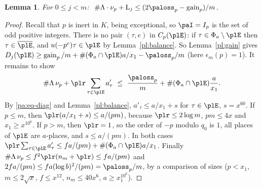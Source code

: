 \documentclass[10pt]{amsart}
\newtheorem{lemma}[theorem]{Lemma}
\theoremstyle{definition}
\theoremstyle{remark}
\providecommand{\auPa}{\Phi_a}
\providecommand{\aubar}[1]{\overline{#1}}
\providecommand{\augain}{\operatorname{gain}}
\begin{document}
\begin{lemma}\label{pl:arith}
For $0\le j<m$: $\ \#\Lambda\cdot\nu_p+\mathrm L_j\le(2\paloss_p-\augain_p)/m$.
\end{lemma}
\begin{proof}
Recall that $p$ is inert in $K$, being exceptional, so $\paI=I_p$ is the set of odd positive
integers. There is no pair $(\tau,e)$ in $C_p(\plE)$: if $\tau\in\auPa\setminus\plE$ then $\tau\in\aubar
\plE$, and $u(-p^e)\tau\in\plE$ by Lemma~\ref{pl:balance}. So Lemma~\ref{pl:gain} gives
$D_j(\plE)\ge\augain_p/m+\#(\auPa\cap\plE)a/x_1-\paloss_p/m$ (here $\epsilon_m(p)=1$). It remains
to show
\[
\#\Lambda\,\nu_p+\plr\sum_{\tau\in\plE}a'_\tau\ \le\ \frac{\paloss_p}m+\#(\auPa\cap\plE)\frac
a{x_1}.
\]
By \eqref{pa:eq-diag} and Lemma~\ref{pl:balance}, $a'_\tau\le a/x_1+s$ for $\tau\in\plE$,
$s=x^{60}$. If $p\le m$, then $\plr(a/x_1+s)\le a/(pm)$, because $\plr\le2\log m$, $pm\le4x$ and
$x_1\ge x^{10^6}$. If $p>m$, then $\plr=1$, so the order of $-p$ modulo $q_0$ is $1$, all places of
$\plE$ are $a$-places, and $s\le a/(pm)$. In both cases $\plr\sum_{\tau\in\plE}a'_\tau\le
fa/(pm)+\#(\auPa\cap\plE)a/x_1$. Finally $\#\Lambda\,\nu_p\le f^2\plr(n_m+\plr)\le fa/(pm)$ and
$2fa/(pm)\le fa(\log b)^2/(pm)=\paloss_p/m$, by a comparison of sizes ($p<x_1$, $m\le2\sqrt x$,
$f\le x^{12}$, $n_m\le40x^6$, $a\ge x_1^{10^6}$).
\end{proof}
\end{document}
